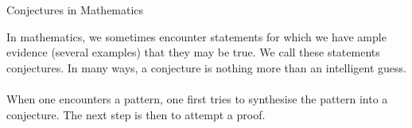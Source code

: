 \begin{mdframed}
\begin{center}
{\Large Conjectures in Mathematics}
\end{center}
\end{mdframed}

\begin{discussion}
In mathematics, we sometimes encounter statements for which we have ample evidence (several examples) that they may be true. We call these statements conjectures. In many ways, a conjecture is nothing more than an intelligent guess.\\
\\
When one encounters a pattern, one first tries to synthesise the pattern into a conjecture. The next step is then to attempt a proof.
\end{discussion}

\vspace*{1em}

